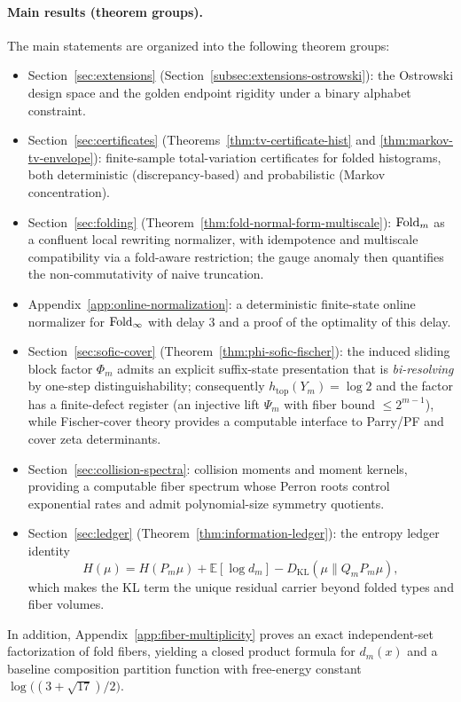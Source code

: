 \paragraph{Main results (theorem groups).}
The main statements are organized into the following theorem groups:
\begin{itemize}
  \item Section~\ref{sec:extensions} (Section~\ref{subsec:extensions-ostrowski}): the Ostrowski design space and the golden endpoint rigidity under a binary alphabet constraint.
  \item Section~\ref{sec:certificates} (Theorems~\ref{thm:tv-certificate-hist} and \ref{thm:markov-tv-envelope}): finite-sample total-variation certificates for folded histograms, both deterministic (discrepancy-based) and probabilistic (Markov concentration).
  \item Section~\ref{sec:folding} (Theorem~\ref{thm:fold-normal-form-multiscale}): $\mathrm{Fold}_m$ as a confluent local rewriting normalizer, with idempotence and multiscale compatibility via a fold-aware restriction; the gauge anomaly then quantifies the non-commutativity of naive truncation.
  \item Appendix~\ref{app:online-normalization}: a deterministic finite-state online normalizer for $\mathrm{Fold}_\infty$ with delay $3$ and a proof of the optimality of this delay.
  \item Section~\ref{sec:sofic-cover} (Theorem~\ref{thm:phi-sofic-fischer}): the induced sliding block factor $\Phi_m$ admits an explicit suffix-state presentation that is \emph{bi-resolving} by one-step distinguishability; consequently $h_{\mathrm{top}}(Y_m)=\log 2$ and the factor has a finite-defect register (an injective lift $\Psi_m$ with fiber bound $\le 2^{m-1}$), while Fischer-cover theory provides a computable interface to Parry/PF and cover zeta determinants.
  \item Section~\ref{sec:collision-spectra}: collision moments and moment kernels, providing a computable fiber spectrum whose Perron roots control exponential rates and admit polynomial-size symmetry quotients.
  \item Section~\ref{sec:ledger} (Theorem~\ref{thm:information-ledger}): the entropy ledger identity
  \[
  H(\mu)=H(P_m\mu)+\mathbb{E}[\log d_m]-D_{\mathrm{KL}}(\mu\|Q_mP_m\mu),
  \]
  which makes the KL term the unique residual carrier beyond folded types and fiber volumes.
\end{itemize}
In addition, Appendix~\ref{app:fiber-multiplicity} proves an exact independent-set factorization of fold fibers, yielding a closed product formula for $d_m(x)$ and a baseline composition partition function with free-energy constant $\log\!\bigl((3+\sqrt{17})/2\bigr)$.

